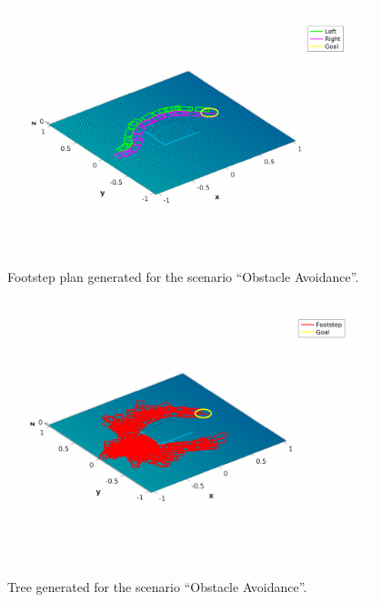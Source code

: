 \begin{figure}
    \centering
    \includegraphics[width=0.95\textwidth]
        {figures/experiments/obstacle-avoidance/footstep-plan.pdf}
    \caption{Footstep plan generated for the scenario ``Obstacle Avoidance''.}
    \label{fig:experiments:obstacle-avoidance:footstep-plan}
\end{figure}
\begin{figure}
    \centering
    \includegraphics[width=0.95\textwidth]
        {figures/experiments/obstacle-avoidance/rrt-tree.pdf}
    \caption{Tree generated for the scenario ``Obstacle Avoidance''.}
    \label{fig:experiments:obstacle-avoidance:rrt-tree}
\end{figure}

